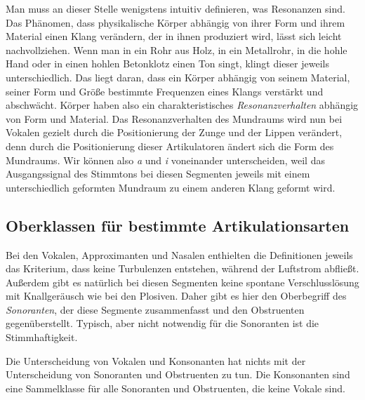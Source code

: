 Man muss an dieser Stelle wenigstens intuitiv definieren, was Resonanzen sind.
Das Phänomen, dass physikalische Körper abhängig von ihrer Form und ihrem Material einen Klang verändern, der in ihnen produziert wird, lässt sich leicht nachvollziehen.
Wenn man in ein Rohr aus Holz, in ein Metallrohr, in die hohle Hand oder in einen hohlen Betonklotz einen Ton singt, klingt dieser jeweils unterschiedlich.
Das liegt daran, dass ein Körper abhängig von seinem Material, seiner Form und Größe bestimmte Frequenzen eines Klangs verstärkt und abschwächt.
Körper haben also ein charakteristisches \textit{Resonanzverhalten} abhängig von Form und Material.
Das Resonanzverhalten des Mundraums wird nun bei Vokalen gezielt durch die Positionierung der Zunge und der Lippen verändert, denn durch die Positionierung dieser Artikulatoren ändert sich die Form des Mundraums.
Wir können also \textit{a} und \textit{i} voneinander unterscheiden, weil das Ausgangssignal des Stimmtons bei diesen Segmenten jeweils mit einem unterschiedlich geformten Mundraum zu einem anderen Klang geformt wird.

\subsection{Oberklassen für bestimmte Artikulationsarten}

\label{sec:photoberklassen}

Bei den Vokalen, Approximanten und Nasalen enthielten die Definitionen jeweils das Kriterium, dass keine Turbulenzen entstehen, während der Luftstrom abfließt.
Außerdem gibt es natürlich bei diesen Segmenten keine spontane Verschlusslösung mit Knallgeräusch wie bei den Plosiven.
Daher gibt es hier den Oberbegriff des \textit{Sonoranten}, der diese Segmente zusammenfasst und den Obstruenten gegenüberstellt.
Typisch, aber nicht notwendig für die Sonoranten ist die Stimmhaftigkeit.



Die Unterscheidung von Vokalen und Konsonanten hat nichts mit der Unterscheidung von Sonoranten und Obstruenten zu tun.
Die Konsonanten sind eine Sammelklasse für alle Sonoranten und Obstruenten, die keine Vokale sind.

